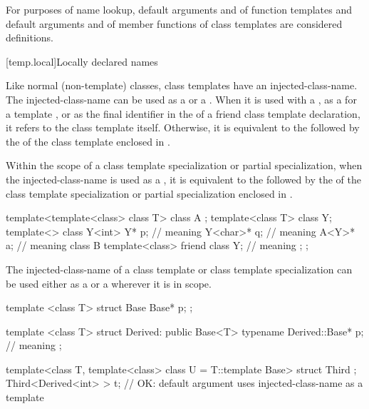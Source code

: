 \pnum
\begin{note}
For purposes of name lookup, default arguments and
 of function templates and default
arguments and  of
member functions of class templates are considered definitions.
\end{note}

[temp.local]{Locally declared names}

\pnum
Like normal (non-template) classes, class templates have an
injected-class-name.
The
injected-class-name can be used
as a  or a .
When it is used with a
,
as a  for a template ,
or as the final identifier in the  of
a friend class template declaration,
it refers to the
class template itself. Otherwise, it is equivalent to the 
followed by the  of the class template
enclosed in \tcode{<>}.

\pnum
Within the scope of a class template specialization or
partial specialization, when the injected-class-name is
used as a ,
it is equivalent to the  followed by the
of the class template specialization or partial
specialization enclosed in
\tcode{<>}.
\begin{example}
\begin{codeblock}
template<template<class> class T> class A { };
template<class T> class Y;
template<> class Y<int> {
  Y* p;                                 // meaning 
  Y<char>* q;                           // meaning 
  A<Y>* a;                              // meaning 
  class B {
    template<class> friend class Y;     // meaning 
  };
};
\end{codeblock}
\end{example}

\pnum
The injected-class-name of a class template or class
template specialization can be used either
as a  or a 
wherever it is in scope.
\begin{example}
\begin{codeblock}
template <class T> struct Base {
  Base* p;
};

template <class T> struct Derived: public Base<T> {
  typename Derived::Base* p;            // meaning 
};

template<class T, template<class> class U = T::template Base> struct Third { };
Third<Derived<int> > t;                 // OK: default argument uses injected-class-name as a template
\end{codeblock}
\end{example}

